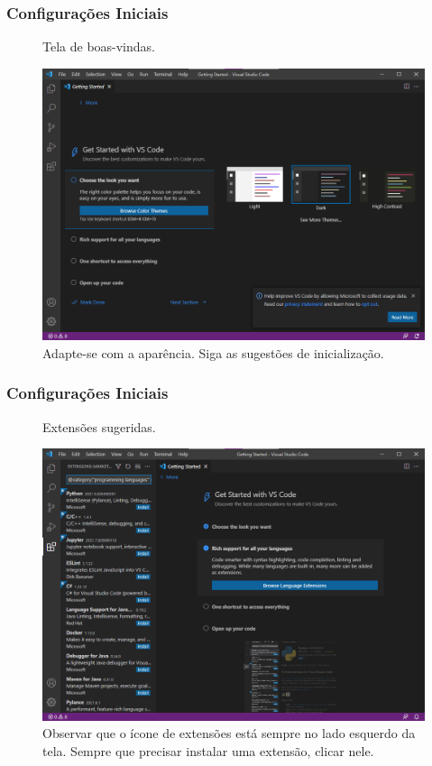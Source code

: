\documentclass[brazilian]{beamer}
\begin{document}
\begin{frame}
    \frametitle{Configurações Iniciais}
    \begin{figure}[h]
        \centering
        \caption{Tela de boas-vindas.}
        \label{fig:welcome_page}
        \includegraphics[width=0.8\textheight]{../images/welcome_page.png}
        \caption*{\footnotesize Adapte-se com a aparência. Siga as sugestões de inicialização.}
    \end{figure}
\end{frame}

\begin{frame}
    \frametitle{Configurações Iniciais}
    \begin{figure}[h]
        \centering
        \caption{Extensões sugeridas.}
        \label{fig:extensoes}
        \includegraphics[width=0.8\textheight]{../images/extensoes.png}
        \caption*{\footnotesize Observar que o ícone de extensões está sempre no lado esquerdo da tela. Sempre que precisar instalar uma extensão, clicar nele.}
    \end{figure}
\end{frame}
\end{document}
